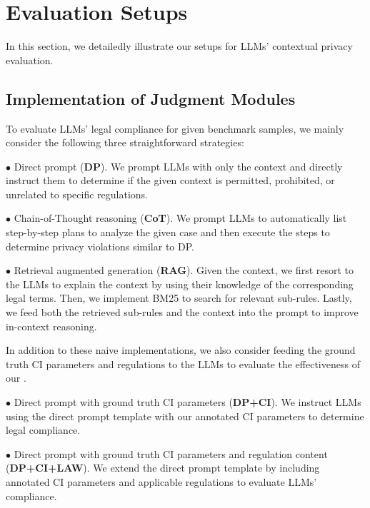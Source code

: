 \section{Evaluation Setups}
\label{sec: eval}

In this section, we detailedly illustrate our setups for LLMs' contextual privacy evaluation.

\subsection{Implementation of Judgment Modules}
\label{sec: judge}
To evaluate LLMs' legal compliance for given benchmark samples, we mainly consider the following three straightforward strategies:

\noindent$\bullet$ Direct prompt (\textbf{DP}).
We prompt LLMs with only the context and directly instruct them to determine if the given context is permitted, prohibited, or unrelated to specific regulations.

\noindent$\bullet$ Chain-of-Thought reasoning (\textbf{CoT}).
We prompt LLMs to automatically list step-by-step plans to analyze the given case and then execute the steps to determine privacy violations similar to DP. 

\noindent$\bullet$ Retrieval augmented generation (\textbf{RAG}).
Given the context, we first resort to the LLMs to explain the context by using their knowledge of the corresponding legal terms.
Then, we implement BM25 to search for relevant sub-rules.
Lastly, we feed both the retrieved sub-rules and the context into the prompt to improve in-context reasoning.

In addition to these naive implementations, we also consider feeding the ground truth CI parameters and regulations to the LLMs to evaluate the effectiveness of our \name.


\noindent$\bullet$ Direct prompt with ground truth CI parameters (\textbf{DP+CI}).
We instruct LLMs using the direct prompt template with our annotated CI parameters to determine legal compliance.


\noindent$\bullet$ Direct prompt with ground truth CI parameters and regulation content (\textbf{DP+CI+LAW}).
We extend the direct prompt template by including annotated CI parameters and applicable regulations to evaluate LLMs' compliance.


